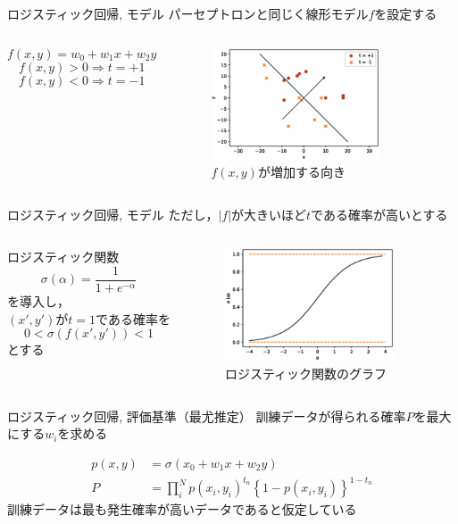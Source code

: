 \documentclass[dvipdfmx,platex]{beamer}
\begin{document}
\begin{frame}{{\mgfamily ロジスティック回帰, モデル}}
  パーセプトロンと同じく線形モデル$f$を設定する
  \begin{columns}[T,onlytextwidth]
    \[f(x,y)=w_0+w_1x+w_2y\]
    \[f(x,y)>0\Rightarrow t = +1\]
    \[f(x,y)<0\Rightarrow t = -1\]
    \begin{figure}
      \centering
      \includegraphics[width=5cm]{fig/direction.eps}
      \caption{$f(x,y)${\mgfamily が増加する向き}}
    \end{figure}
  \end{columns}
\end{frame}
\begin{frame}{{\mgfamily ロジスティック回帰, モデル}}
  ただし，$|f|$が大きいほど$t$である確率が高いとする
  \begin{columns}[T,onlytextwidth]
    ロジスティック関数
    \[\sigma\left(\alpha\right)=\frac{1}{1+e^{-\alpha}}\]
    を導入し，\\
    $(x',y')$が$t=1$である確率を\\
    \[0 < \sigma \left(f\left(x',y'\right)\right) < 1\]
    とする
    \begin{figure}
      \centering
      \includegraphics[width=5cm]{fig/sigmoid.eps}
      \caption{{\mgfamily ロジスティック関数のグラフ}}
    \end{figure}
  \end{columns}
\end{frame}
\begin{frame}{{\mgfamily ロジスティック回帰, 評価基準（最尤推定）}}
  訓練データが得られる確率$P$を最大にする$w_i$を求める

  \begin{align*}
    p(x,y)&=\sigma(x_0+w_1x+w_2y)\\
    P&=\prod_{i}^{N}{p\left(x_i,y_i\right)}^{t_n}{\left\{1-p\left(x_i,y_i\right)\right\}}^{1-t_n}
  \end{align*}  
  訓練データは最も発生確率が高いデータであると仮定している
\end{frame}
\end{document}
